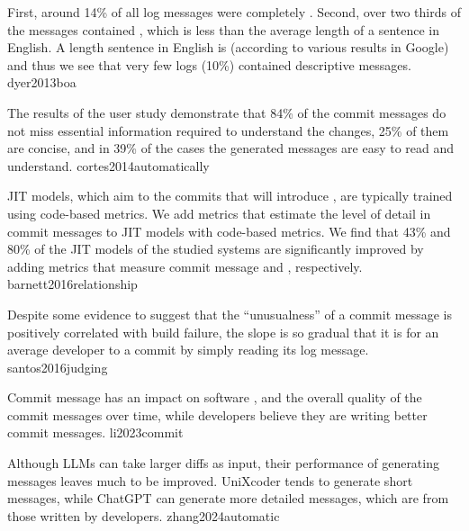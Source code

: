 \documentclass{article}
\begin{document}
  {First, around 14\% of all log messages were completely . Second, over two thirds of the messages contained , which is less than the average length of a sentence in English. A  length sentence in English is  (according to various results in Google) and thus we see that very few logs (10\%) contained descriptive messages.}
  {dyer2013boa}

  {The results of the user study demonstrate that 84\% of the  commit messages do not miss essential information required to understand the changes, 25\% of them are concise, and in 39\% of the cases the generated messages are easy to read and understand.}
  {cortes2014automatically}

  {JIT models, which aim to  the commits that will introduce , are typically trained using code-based metrics. We add metrics that estimate the level of detail in commit messages to JIT models with code-based metrics. We find that 43\% and 80\% of the JIT models of the studied systems are significantly improved by adding metrics that measure commit message  and , respectively.}
  {barnett2016relationship}

  {Despite some evidence to suggest that the ``unusualness'' of a commit message is positively correlated with build failure, the slope is so gradual that it is  for an average developer to  a commit by simply reading its log message.}
  {santos2016judging}

  {Commit message  has an impact on software , and the overall quality of the commit messages  over time, while developers believe they are writing better commit messages.}
  {li2023commit}

  {Although LLMs can take larger diffs as input, their performance of generating messages leaves much to be improved. UniXcoder tends to generate short messages, while ChatGPT can generate more detailed messages, which are  from those written by developers.}
  {zhang2024automatic}
\end{document}
